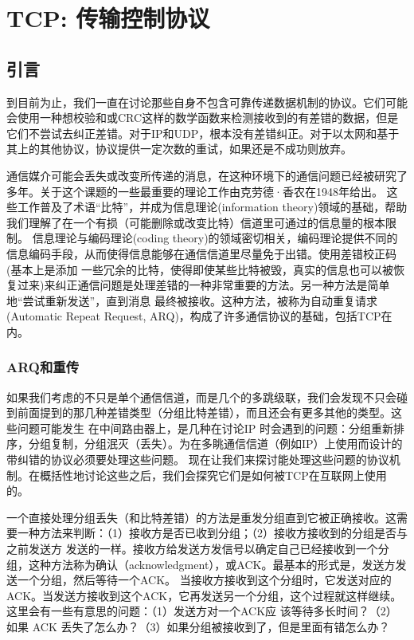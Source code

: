 \chapter{TCP: 传输控制协议}

\section{引言}
到目前为止，我们一直在讨论那些自身不包含可靠传递数据机制的协议。它们可能会使用一种想校验和或CRC这样的数学函数来检测接收到的有差错的数据，但是
它们不尝试去纠正差错。对于IP和UDP，根本没有差错纠正。对于以太网和基于其上的其他协议，协议提供一定次数的重试，如果还是不成功则放弃。

通信媒介可能会丢失或改变所传递的消息，在这种环境下的通信问题已经被研究了多年。关于这个课题的一些最重要的理论工作由克劳德·香农在1948年给出。
这些工作普及了术语“比特”，并成为信息理论(information theory)领域的基础，帮助我们理解了在一个有损（可能删除或改变比特）信道里可通过的信息量的根本限制。
信息理论与编码理论(coding theory)的领域密切相关，编码理论提供不同的信息编码手段，从而使得信息能够在通信信道里尽量免于出错。使用差错校正码(基本上是添加
一些冗余的比特，使得即使某些比特被毁，真实的信息也可以被恢复过来)来纠正通信问题是处理差错的一种非常重要的方法。另一种方法是简单地“尝试重新发送”，直到消息
最终被接收。这种方法，被称为自动重复请求 (Automatic Repeat Request, ARQ)，构成了许多通信协议的基础，包括TCP在内。
\subsection{ARQ和重传}
如果我们考虑的不只是单个通信信道，而是几个的多跳级联，我们会发现不只会碰到前面提到的那几种差错类型（分组比特差错），而且还会有更多其他的类型。这些问题可能发生
在中间路由器上，是几种在讨论IP 时会遇到的问题：分组重新排序，分组复制，分组泯灭（丢失）。为在多眺通信信道（例如IP）上使用而设计的带纠错的协议必须要处理这些问题。
现在让我们来探讨能处理这些问题的协议机制。在概括性地讨论这些之后，我们会探究它们是如何被TCP在互联网上使用的。

一个直接处理分组丢失（和比特差错）的方法是重发分组直到它被正确接收。这需要一种方法来判断：（1）接收方是否已收到分组；（2）接收方接收到的分组是否与之前发送方
发送的一样。接收方给发送方发信号以确定自己已经接收到一个分组，这种方法称为确认（acknowledgment），或ACK。最基本的形式是，发送方发送一个分组，然后等待一个ACK。
当接收方接收到这个分组时，它发送对应的ACK。当发送方接收到这个ACK，它再发送另一个分组，这个过程就这样继续。这里会有一些有意思的问题：（1）发送方对一个ACK应
该等待多长时间？（2）如果 ACK 丢失了怎么办？（3）如果分组被接收到了，但是里面有错怎么办？


